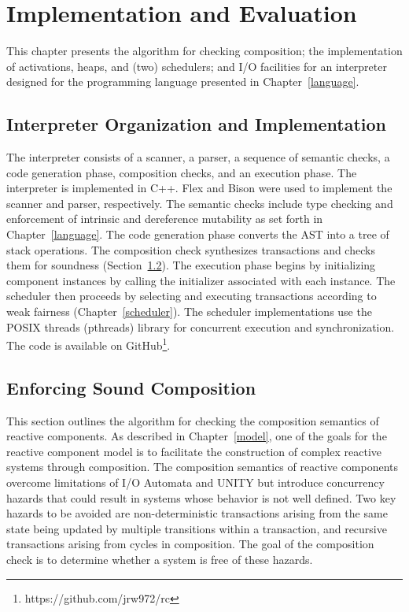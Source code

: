 \chapter{Implementation and Evaluation}
\label{implementation}

This chapter presents the algorithm for checking composition; the implementation of activations, heaps, and (two) schedulers; and I/O facilities for an interpreter designed for the \rcgo programming language presented in Chapter~\ref{language}.

\section{Interpreter Organization and Implementation}
\label{interpreter}

The interpreter consists of a scanner, a parser, a sequence of semantic checks, a code generation phase, composition checks, and an execution phase.
The interpreter is implemented in C++.
Flex and Bison were used to implement the scanner and parser, respectively.
The semantic checks include type checking and enforcement of intrinsic and dereference mutability as set forth in Chapter~\ref{language}.
The code generation phase converts the AST into a tree of stack operations.
The composition check synthesizes transactions and checks them for soundness (Section~\ref{sound_composition}).
The execution phase begins by initializing component instances by calling the initializer associated with each instance.
The scheduler then proceeds by selecting and executing transactions according to weak fairness (Chapter~\ref{scheduler}).
The scheduler implementations use the POSIX threads (pthreads) library for concurrent execution and synchronization.
The code is available on GitHub\footnote{https://github.com/jrw972/rc}.

\section{Enforcing Sound Composition}
\label{sound_composition}

This section outlines the algorithm for checking the composition semantics of reactive components.
As described in Chapter~\ref{model}, one of the goals for the reactive component model is to facilitate the construction of complex reactive systems through composition.
The composition semantics of reactive components overcome limitations of I/O Automata and UNITY but introduce concurrency hazards that could result in systems whose behavior is not well defined.
Two key hazards to be avoided are non-deterministic transactions arising from the same state being updated by multiple transitions within a transaction, and recursive transactions arising from cycles in composition.
The goal of the composition check is to determine whether a system is free of these hazards.

